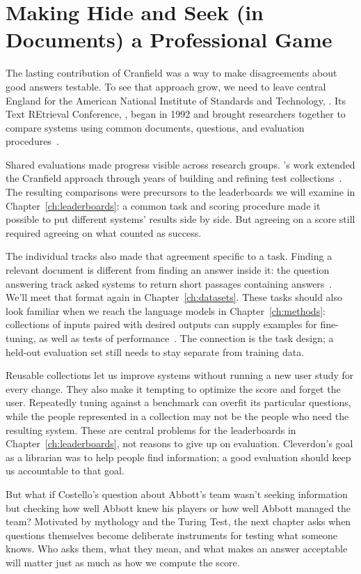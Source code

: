 \section{Making Hide and Seek (in Documents) a Professional Game}
\label{sec:ir:nist}

The lasting contribution of Cranfield was a way to make disagreements
about good answers testable.  To see that approach grow, we need to leave
central England for the American National Institute of Standards and
Technology, .  Its Text REtrieval Conference, , began
in 1992 and brought researchers together to compare systems using common
documents, questions, and evaluation procedures~\citep{nist-trec}.

Shared evaluations made progress visible across research groups.
's work extended the Cranfield approach through years of
building and refining test collections~\citep{voorhees-19}.  The resulting
comparisons were precursors to the leaderboards we will examine in
Chapter~\ref{ch:leaderboards}: a common task and scoring procedure made
it possible to put different systems' results side by side.  But agreeing
on a score still required agreeing on what counted as success.

The individual  tracks also made that agreement specific to a
task.  Finding a relevant document is different from finding an answer
inside it: the question answering track asked systems to return short
passages containing answers~\citep{voorhees1999trec8}.  We'll meet that
format again in Chapter~\ref{ch:datasets}.  These tasks should also look
familiar when we reach the language models in Chapter~\ref{ch:methods}:
collections of inputs paired with desired outputs can supply examples
for fine-tuning, as well as tests of performance~\citep{raffel-20,wei-22}.
The connection is the task design; a held-out evaluation set still needs
to stay separate from training data.

Reusable collections let us improve systems without running a new user
study for every change.  They also make it tempting to optimize the score
and forget the user.  Repeatedly tuning against a benchmark can overfit
its particular questions, while the people represented in a collection
may not be the people who need the resulting system.  These are central
problems for the leaderboards in Chapter~\ref{ch:leaderboards}, not reasons
to give up on evaluation.  Cleverdon's goal as a librarian was to help
people find information; a good evaluation should keep us accountable
to that goal.

But what if Costello's question about Abbott's team wasn't seeking
information but checking how well Abbott knew his players or how well
Abbott managed the team?
%
Motivated by mythology and the Turing Test, the next chapter asks when
questions themselves become deliberate instruments for testing what
someone knows.
%
Who asks them, what they mean, and what makes an answer acceptable will
matter just as much as how we compute the score.
